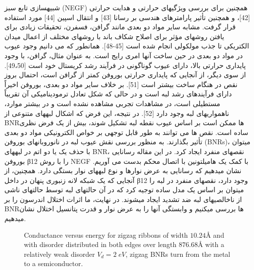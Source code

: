 شبیهسازی تابع سبز (NEGF) همچنین برای بررسی ویژگیهای حرارتی و هدایت حرارتی [42]، و همچنین تأثیر پارامترهای هندسی بر رسانا [43] و انتقال اسپین [44] مورد استفاده قرار گرفت. مشابه سایر مواد دو بعدی مانند گرافن، فسفرن، تحقیقات زیادی برای یافتن روشهای مؤثر برای اصلاح شکاف باند با روشهای مختلف از اعمال میدان الکتریکی تا جذب مولکولی انجام شده است [45-48]. همانطور که می دانیم وجود عیوب در مواد دو بعدی در حین ساخت آنها امری رایج است. به عنوان مثال، گرافن، با وجود پایداری حرارتی بالا، دارای عیوب گوناگونی در فرآیند رشد کریستال خود است [49،50]. از سوی دیگر، از آنجایی که پایداری حرارتی بوروفن کمتر از گرافن است، احتمال بروز نقص در هنگام ساخت بیشتر است [51]. بر خلاف سایر مواد دو بعدی، بوروفن اخیراً دارای فرآیندهای رشد لبه است و در حالی که شکل تعادل ترمودینامیکی آن تقریباً مستطیلی است، در مشاهدات تجربی مشاهده نشده است و در بیشتر موارد، ناهمواریهای لبه وجود دارد [52]. در نتیجه، این فرض که اشکال لبههای متنوعی از BNRها ممکن است بر اساس عیوب نقطه لبه تشکیل شوند، بیش از یک فرض نظری ساده است. نقص ها می توانند به طور قابل توجهی بر خواص الکترونیکی مواد دو بعدی تأثیر بگذارند. به منظور بررسی نقش عیوب لبه در نانوروبانهای بوروفن (BNRs)، میتوان با حذف یک یا دو اتم در لبههای BNR، نقصهای منفرد ایجاد کرد. در این مقاله رسانایی بوروفن β12 را با روش NEGF با کمک یک هامیلتونین با اتصال محکم بدست می آوریم. نشان میدهیم که رسانایی به عرض نوارها و نوع لبههای نوار بستگی دارد. همچنین، از آنجایی که یک شبکه لانه زنبوری پنهان در داخل β12 وجود دارد، نقصهای منفرد در لبه را میتوان بر اساس یک مدل ساده توجیه کرد که در آن حالتهای لبه توسط حالتهای ناشی از ناخالصیهای لبه ضد تشدید ایجاد میشوند. در نهایت، ما اثرات اختلال اندرسون را بر BNRها بررسی میکنیم و وابستگی آنها را به عرض نوار و قدرت پتانسیل اختلال نشان میدهیم.

\begin{figure}[!ht]
    \centering
      
      \caption{Conductance versus energy for zigzag ribbons of width $10.24$\AA 
      and with disorder distributed in both edges over length $876.68$\AA
      with a relatively weak disorder $V_d=2\;eV$, zigzag BNRs turn from the metal to a semiconductor.}
      \label{zigzagdisorder}
    \end{figure}
    
